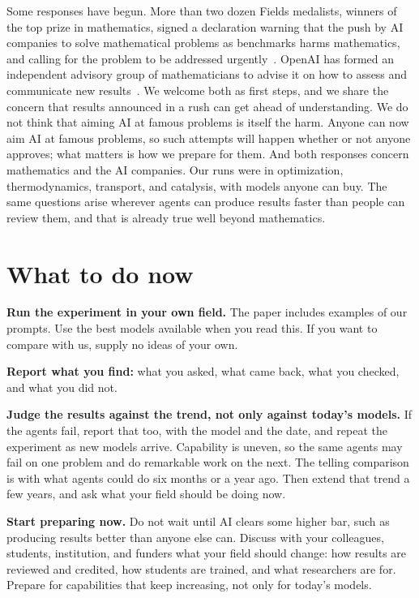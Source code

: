 \documentclass[11pt]{article}
\begin{document}
Some responses have begun.
More than two dozen Fields medalists, winners of the top prize in mathematics, signed a declaration warning that the push by AI companies to solve mathematical problems as benchmarks harms mathematics, and calling for the problem to be addressed urgently~\citep{fields2026declaration}.
OpenAI has formed an independent advisory group of mathematicians to advise it on how to assess and communicate new results~\citep{openai2026advisory}.
We welcome both as first steps, and we share the concern that results announced in a rush can get ahead of understanding.
We do not think that aiming AI at famous problems is itself the harm.
Anyone can now aim AI at famous problems, so such attempts will happen whether or not anyone approves; what matters is how we prepare for them.
And both responses concern mathematics and the AI companies.
Our runs were in optimization, thermodynamics, transport, and catalysis, with models anyone can buy.
The same questions arise wherever agents can produce results faster than people can review them, and that is already true well beyond mathematics.

\section*{What to do now}

\textbf{Run the experiment in your own field.}
The paper includes examples of our prompts.
Use the best models available when you read this.
If you want to compare with us, supply no ideas of your own.

\textbf{Report what you find:} what you asked, what came back, what you checked, and what you did not.

\textbf{Judge the results against the trend, not only against today's models.}
If the agents fail, report that too, with the model and the date, and repeat the experiment as new models arrive.
Capability is uneven, so the same agents may fail on one problem and do remarkable work on the next.
The telling comparison is with what agents could do six months or a year ago.
Then extend that trend a few years, and ask what your field should be doing now.

\textbf{Start preparing now.}
Do not wait until AI clears some higher bar, such as producing results better than anyone else can.
Discuss with your colleagues, students, institution, and funders what your field should change: how results are reviewed and credited, how students are trained, and what researchers are for.
Prepare for capabilities that keep increasing, not only for today's models.
\end{document}
